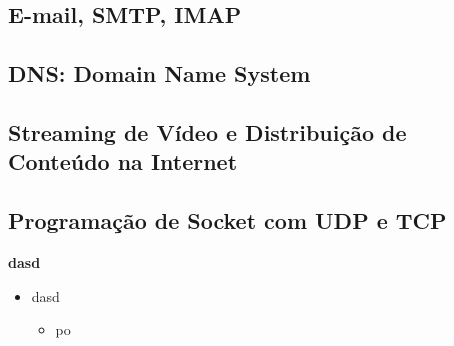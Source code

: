 \subsection{E-mail, SMTP, IMAP}
\subsection{DNS: Domain Name System}
\subsection{Streaming de Vídeo e Distribuição de Conteúdo na Internet}
\subsection{Programação de Socket com UDP e TCP}

    \textbf{dasd}

    \begin{itemize}[left=0.5cm, align=left, nosep]    
        \item dasd
        \begin{itemize}[left=0.5cm, nosep, label=$\hookrightarrow$]
            \item po
        \end{itemize}  
    \end{itemize}  

    \begin{figure}[H]
        \centering
    \end{figure}
